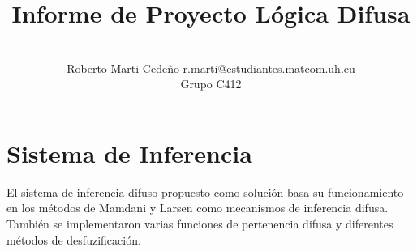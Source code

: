 \documentclass[a4paper,10pt,twocolumn]{article}
\title{Informe de Proyecto Lógica Difusa}
\author{\\
	\name Roberto Marti Cede\~no \email \href{mailto:r.marti@estudiantes.matcom.uh.cu}{r.marti@estudiantes.matcom.uh.cu}
	\\ \addr Grupo C412
}
\begin{document}



\section{Sistema de Inferencia}\label{sec:intro}
	El sistema de inferencia difuso propuesto como solución basa su funcionamiento en los métodos de Mamdani y Larsen como mecanismos de inferencia difusa. También se implementaron varias funciones de pertenencia difusa y diferentes métodos de desfuzificación.
	
\end{document}
